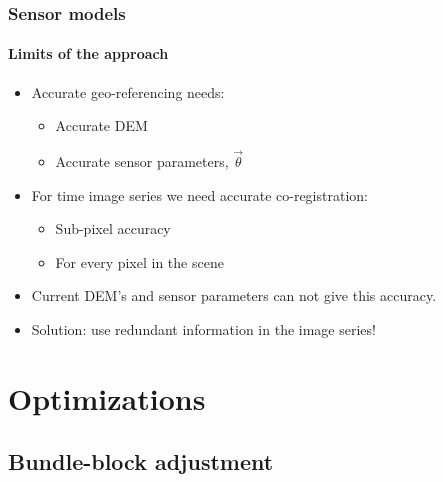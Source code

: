 \documentclass[compress]{beamer}
\begin{document}
\begin{frame}
  \frametitle{Sensor models}
  \framesubtitle{Limits of the approach}

  \begin{itemize}
    \item Accurate geo-referencing needs:
      \begin{itemize}
	\item Accurate DEM
	\item Accurate sensor parameters, $\vec\theta$
      \end{itemize}
    \item For time image series we need \alert{accurate co-registration}:
      \begin{itemize}
      \item Sub-pixel accuracy
      \item For every pixel in the scene
      \end{itemize}
    \item Current DEM's and sensor parameters can not give this
    accuracy.
    \item Solution: use redundant information in the image series!
  \end{itemize}
\end{frame}

\section{Optimizations}
\subsection[BBA]{Bundle-block adjustment}
\end{document}

